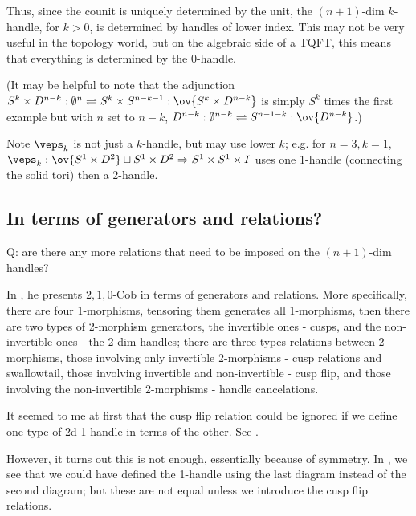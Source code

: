\documentclass[12pt]{article}
\newcommand{\disk}[1]{{D^{#1}}}
\newcommand{\sphr}[1]{{S^{#1}}}
\newcommand{\empt}[1]{{\emptyset^{#1}}}
\begin{document}
Thus, since the counit is uniquely determined by the unit,
the $(n+1)$-dim $k$-handle, for $k > 0$,
is determined by handles of lower index.
This may not be very useful in the topology world,
but on the algebraic side of a TQFT,
this means that everything is determined by the 0-handle.



(It may be helpful to note that the adjunction
$\sphr{k} \times \disk{n-k} : \empt{n} \rightleftharpoons
	\sphr{k} \times \sphr{n-k-1} : \ov{\sphr{k} \times \disk{n-k}}$
is simply $\sphr{k}$ times
the first example but with $n$ set to $n-k$,
$\disk{n-k} : \empt{n-k} \rightleftharpoons
	\sphr{n-1-k}: \ov{\disk{n-k}}$.)


Note $\veps_k$ is not just a $k$-handle,
but may use lower $k$;
e.g. for $n = 3, k = 1$,
$\veps_k: \ov{S^1 \times D^2} \sqcup S^1 \times D^2 \Rightarrow
S^1 \times S^1 \times I$
uses one 1-handle (connecting the solid tori)
then a 2-handle.


\subsection{In terms of generators and relations?}

Q: are there any more relations that need to be imposed
on the $(n+1)$-dim handles?


In \cite{SPries}, he presents $2,1,0$-Cob in terms of
generators and relations.
More specifically, there are four 1-morphisms,
tensoring them generates all 1-morphisms,
then there are two types of 2-morphism generators,
the invertible ones - cusps,
and the non-invertible ones - the 2-dim handles;
there are three types relations between 2-morphisms,
those involving only invertible 2-morphisms
- cusp relations and swallowtail,
those involving invertible and non-invertible - cusp flip,
and those involving the non-invertible 2-morphisms
- handle cancelations.

It seemed to me at first that the cusp flip relation could be
ignored if we define one type of 2d 1-handle
in terms of the other.
See .

However, it turns out this is not enough,
essentially because of symmetry.
In , we see that we could have defined
the 1-handle using the last diagram instead of the second diagram;
but these are not equal unless we introduce the cusp flip relations.
\end{document}
